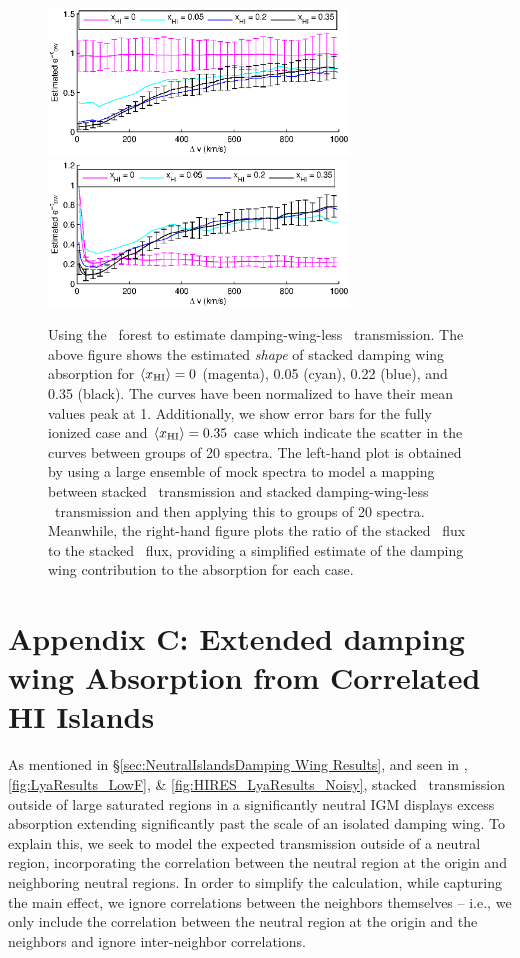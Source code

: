 \begin{figure}[!ht]
  \centering
  \includegraphics[width=8cm]{fig12a.eps}
  \includegraphics[width=8cm]{fig12b.eps}
  \caption{Using the \lyb\ forest to estimate damping-wing-less \lya\ transmission. The above figure shows the estimated \textit{shape} of stacked damping wing absorption for $\langle x_{\text{HI}}\rangle = 0$ (magenta), 0.05 (cyan), 0.22 (blue), and 0.35 (black). The curves have been normalized to have their mean values peak at 1. Additionally, we show error bars for the fully ionized case and $\langle x_{\text{HI}}\rangle = 0.35$ case which indicate the scatter in the curves between groups of 20 spectra. The left-hand plot is obtained by using a large ensemble of mock spectra to model a mapping between stacked \lyb\ transmission and stacked damping-wing-less \lya\ transmission and then applying this to groups of 20 spectra. Meanwhile, the right-hand figure plots the ratio of the stacked \lya\ flux to the stacked \lyb\ flux, providing a simplified estimate of the damping wing contribution to the absorption for each case. }
  \label{fig:DWShape}
\end{figure}


\section*{Appendix C: Extended damping wing Absorption from Correlated HI Islands} \label{sec:NeutralIslandsCorrelation}


As mentioned in \S\ref{sec:NeutralIslandsDamping Wing Results}, and seen in , \ref{fig:LyaResults_LowF}, \& \ref{fig:HIRES_LyaResults_Noisy}, stacked \lya\ transmission outside of large saturated regions in a significantly neutral IGM displays excess absorption extending significantly past the scale of an isolated damping wing. To explain this, we seek to model the expected transmission outside of a neutral region, incorporating the correlation between the neutral region at the origin and neighboring neutral regions.  In order to simplify the calculation, while capturing the main effect, we ignore correlations between the neighbors themselves -- i.e., we only include the correlation between the neutral region at the origin and the neighbors and ignore inter-neighbor correlations.

